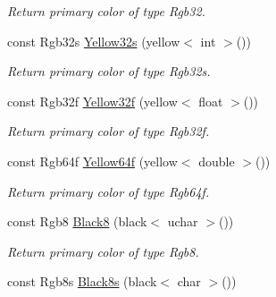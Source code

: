 \begin{DoxyCompactItemize}
\begin{DoxyCompactList}\small\item\em Return primary color of type Rgb32. \end{DoxyCompactList}\item 
\hypertarget{group___primary_colors_gafda747b3ce2a23dbedcd60b246c8963f}{const Rgb32s \hyperlink{group___primary_colors_gafda747b3ce2a23dbedcd60b246c8963f}{Yellow32s} (yellow$<$ int $>$())}\label{group___primary_colors_gafda747b3ce2a23dbedcd60b246c8963f}

\begin{DoxyCompactList}\small\item\em Return primary color of type Rgb32s. \end{DoxyCompactList}\item 
\hypertarget{group___primary_colors_ga69028963fa031abd357693846b4cc0d4}{const Rgb32f \hyperlink{group___primary_colors_ga69028963fa031abd357693846b4cc0d4}{Yellow32f} (yellow$<$ float $>$())}\label{group___primary_colors_ga69028963fa031abd357693846b4cc0d4}

\begin{DoxyCompactList}\small\item\em Return primary color of type Rgb32f. \end{DoxyCompactList}\item 
\hypertarget{group___primary_colors_ga347649a808efdbe4466095a8663e85fd}{const Rgb64f \hyperlink{group___primary_colors_ga347649a808efdbe4466095a8663e85fd}{Yellow64f} (yellow$<$ double $>$())}\label{group___primary_colors_ga347649a808efdbe4466095a8663e85fd}

\begin{DoxyCompactList}\small\item\em Return primary color of type Rgb64f. \end{DoxyCompactList}\item 
\hypertarget{group___primary_colors_ga7edec80c32ccfc9bbfe90ad701444e13}{const Rgb8 \hyperlink{group___primary_colors_ga7edec80c32ccfc9bbfe90ad701444e13}{Black8} (black$<$ uchar $>$())}\label{group___primary_colors_ga7edec80c32ccfc9bbfe90ad701444e13}

\begin{DoxyCompactList}\small\item\em Return primary color of type Rgb8. \end{DoxyCompactList}\item 
\hypertarget{group___primary_colors_gaed8c3ac856006472dd1a4189e9a58f07}{const Rgb8s \hyperlink{group___primary_colors_gaed8c3ac856006472dd1a4189e9a58f07}{Black8s} (black$<$ char $>$())}\label{group___primary_colors_gaed8c3ac856006472dd1a4189e9a58f07}


\end{DoxyCompactItemize}
